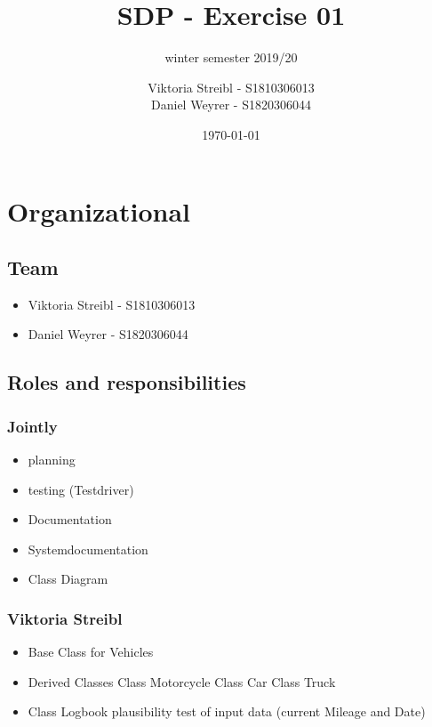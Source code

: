 


\title{SDP - Exercise 01} %
\subtitle{winter semester 2019/20} %
\author{
Viktoria Streibl - S1810306013\\
  Daniel Weyrer - S1820306044
} %
\date{\today} %

\maketitle %

\newpage
\tableofcontents %
\newpage

\section{Organizational}
\subsection{Team}
\begin{itemize}
	\item Viktoria 	Streibl 		- 	S1810306013
	\item Daniel 	Weyrer		-	S1820306044
\end{itemize}

\subsection{Roles and responsibilities}

\subsubsection{Jointly}
\begin{itemize}
	\item planning
	\item testing (Testdriver)
	\item Documentation
	\item Systemdocumentation
	\item Class Diagram
\end{itemize}

\subsubsection{Viktoria Streibl}
\begin{itemize}
	\item Base Class for Vehicles
	\item Derived Classes
		\subitem Class Motorcycle
		\subitem Class Car
		\subitem Class Truck
	\item Class Logbook
		\subitem plausibility test of input data (current Mileage and Date)
\end{itemize}

